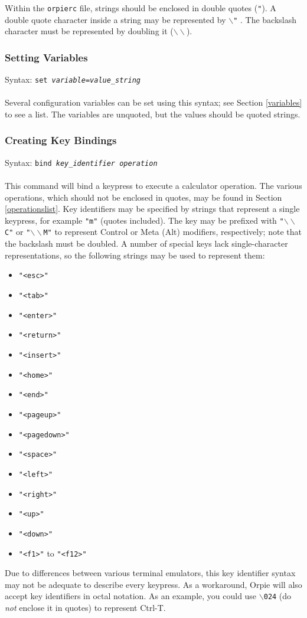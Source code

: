 \documentclass[11pt,notitlepage]{article}
\begin{document}
Within the {\tt orpierc} file, strings should be enclosed in double quotes ({\tt "}).
A double quote character inside a string may be represented by {\tt $\backslash$"} .  The
backslash character must be represented by doubling it ({\tt $\backslash\backslash$}).

\subsubsection{Setting Variables}
\label{setvar}
Syntax: {\tt set {\em variable}={\em value\_string}} \\ \\
Several configuration variables can be set using this syntax; see Section \ref{variables}
to see a list.  The variables are unquoted, but the values should be quoted strings.

\subsubsection{Creating Key Bindings}
\label{bindings}
Syntax: {\tt bind {\em key\_identifier operation}} \\ \\
This command will bind a keypress to execute a calculator operation.  
The various operations, which should not be enclosed in quotes,
may be found in Section \ref{operationslist}. Key identifiers may be specified
by strings that represent a single keypress, for example {\tt "m"} (quotes
included).  The key may be prefixed with {\tt "$\backslash\backslash$C"} or
{\tt "$\backslash\backslash$M"} to represent Control or Meta (Alt) modifiers,
respectively; note that the backslash must be doubled.  A number of special
keys lack single-character representations, so the following strings may be
used to represent them:
\begin{itemize}
   \item {\tt "<esc>"}
   \item {\tt "<tab>"}
   \item {\tt "<enter>"}
   \item {\tt "<return>"}
   \item {\tt "<insert>"}
   \item {\tt "<home>"}
   \item {\tt "<end>"}
   \item {\tt "<pageup>"}
   \item {\tt "<pagedown>"}
   \item {\tt "<space>"}
   \item {\tt "<left>"}
   \item {\tt "<right>"}
   \item {\tt "<up>"}
   \item {\tt "<down>"}
   \item {\tt "<f1>"} to {\tt "<f12>"}
\end{itemize}
Due to differences between various terminal emulators, this key identifier syntax may
not be adequate to describe every keypress.  As a workaround, Orpie will also accept key
identifiers in octal notation.  As an example, you could use {\tt $\backslash$024} 
(do {\em not} enclose it in quotes) to represent Ctrl-T.
\end{document}
